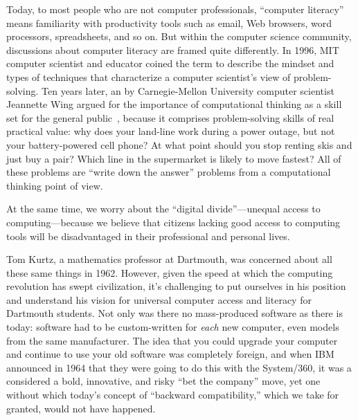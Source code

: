 \documentclass{article}
\begin{document}
Today, to most people who are not computer professionals, ``computer
literacy'' means familiarity with 
productivity tools such as email, Web browsers, word processors,
spreadsheets, and so on.  
But within the computer science community, discussions about computer
literacy are framed quite differently.  
In 1996, MIT computer scientist and educator
 coined the term  to
describe the mindset and types of techniques that
characterize a computer scientist's view of problem-solving.
Ten years later, an
 by Carnegie-Mellon University computer scientist
Jeannette Wing argued for the importance of computational thinking as a
skill set for the general 
public~\cite{wing_computational_thinking}, because it comprises
problem-solving skills of real practical value: why does your land-line
work during a power outage, but not your battery-powered cell phone?  At
what point should you stop renting skis and just buy a pair?  Which line
in the supermarket is likely to move fastest?  All of these problems are
``write down the answer'' problems from a computational thinking point
of view.

At the same time, we worry about the ``digital divide''---unequal access
to computing---because we believe that citizens lacking good access to
computing tools will be disadvantaged in their professional and personal
lives.

Tom Kurtz, a mathematics professor at Dartmouth, was concerned about all
these same things in 1962.
However, given the speed at which the computing revolution has swept
civilization, it's challenging to put ourselves in his position and
understand his vision for universal computer access and literacy for
Dartmouth students.
Not only was there no mass-produced software as
there is today: software  had to be custom-written for \emph{each} new
computer, even models from the same manufacturer.  
The idea that
you could upgrade your computer and continue to use your old software
was completely foreign, and when IBM announced in 1964 that
they were going to do this with the System/360, it was a considered a bold,
innovative, and risky ``bet the
company'' move, yet one without which today's concept of ``backward
compatibility,'' which we take for granted, would not have happened.
\end{document}
